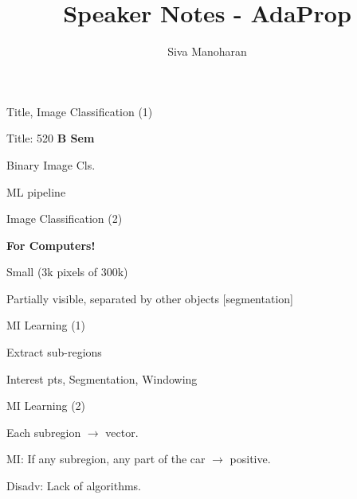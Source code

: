 \documentclass[13pt,handout]{beamer}
\author{Siva Manoharan}
\title{Speaker Notes - AdaProp}
\newenvironment{wideitemize}{\itemize\addtolength{\itemsep}{20pt}}{\enditemize}
\begin{document}
\Huge

\begin{frame}{Title, Image Classification (1)}
    \begin{wideitemize}
    \item Title: 520 {\bf B Sem}
    \item Binary Image Cls.
    \item ML pipeline
    \end{wideitemize}
\end{frame}

\begin{frame}{Image Classification (2)}
    \begin{wideitemize}
    \item {\bf For Computers!}
    \item Small (3k pixels of 300k)
    \item Partially visible, separated by other objects [segmentation]
    \end{wideitemize}
\end{frame}

\begin{frame}{MI Learning (1)}
    \begin{wideitemize}
    \item Extract sub-regions
    \item Interest pts, Segmentation, Windowing
    \end{wideitemize}
\end{frame}

\begin{frame}{MI Learning (2)}
\begin{wideitemize}
    \item Each subregion $\to$ vector.
    \item MI: If any subregion, any part of the car $\to$ positive.
    \item Disadv: Lack of algorithms.
\end{wideitemize}
\end{frame}
\end{document}
